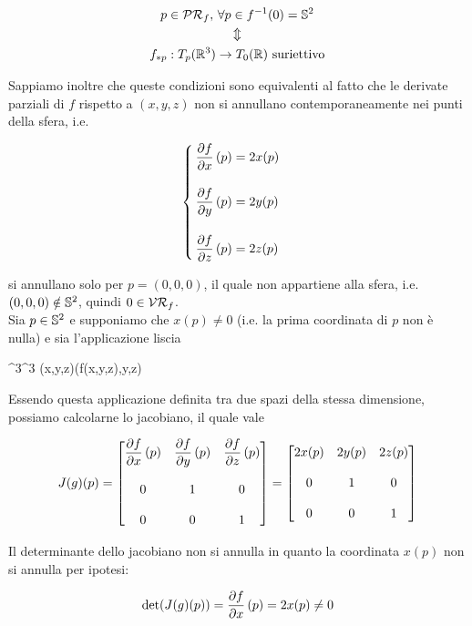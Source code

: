 \begin{gather}
	p \in \PR_{f}, \, \forall p \in f^{-1}(0) = \S^{2} \nonumber \\
	\Updownarrow \\
	f_{*p} : T_{p}(\R^{3}) \to T_{0}(\R) \text{ suriettivo} \nonumber
\end{gather}

Sappiamo inoltre che queste condizioni sono equivalenti al fatto che le derivate parziali di $ f $ rispetto a $ (x,y,z) $ non si annullano contemporaneamente nei punti della sfera, i.e.

\begin{equation}
	\begin{cases}
		\dpdv{f}{x} \, (p) = 2x(p) \\ \\
		\dpdv{f}{y} \, (p) = 2y(p) \\ \\
		\dpdv{f}{z} \, (p) = 2z(p)
	\end{cases}
\end{equation}

si annullano solo per $ p = (0,0,0) $, il quale non appartiene alla sfera, i.e. $ (0,0,0) \notin \S^{2} $, quindi $ 0 \in \VR_{f} $. \\
Sia $ p \in \S^{2} $ e supponiamo che $ x(p) \neq 0 $ (i.e. la prima coordinata di $ p $ non è nulla) e sia l'applicazione liscia

	{\R^{3}}{\R^{3}}
	{(x,y,z)}{(f(x,y,z),y,z)}

Essendo questa applicazione definita tra due spazi della stessa dimensione, possiamo calcolarne lo jacobiano, il quale vale

\begin{equation}
	J(g)(p) = \bmqty{ \dpdv{f}{x} \, (p) & \dpdv{f}{y} \, (p) & \dpdv{f}{z} \, (p) \\ \\ 0 & 1 & 0 \\ \\ 0 & 0 & 1 } %
	= \bmqty{ 2x(p) & 2y(p) & 2z(p) \\ \\ 0 & 1 & 0 \\ \\ 0 & 0 & 1 }
\end{equation}

Il determinante dello jacobiano non si annulla in quanto la coordinata $ x(p) $ non si annulla per ipotesi:

\begin{equation}
	\det(J(g)(p)) = \pdv{f}{x} \, (p) = 2x(p) \neq 0
\end{equation}

